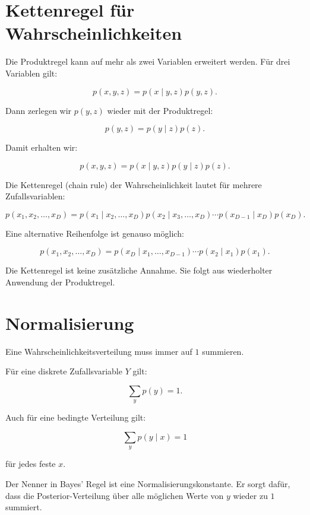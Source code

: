 \section{Kettenregel für Wahrscheinlichkeiten}

Die Produktregel kann auf mehr als zwei Variablen erweitert werden.
Für drei Variablen gilt:

\[
    p(x,y,z)
    =
    p(x \mid y,z)p(y,z).
\]

Dann zerlegen wir \(p(y,z)\) wieder mit der Produktregel:

\[
    p(y,z)
    =
    p(y \mid z)p(z).
\]

Damit erhalten wir:

\[
    p(x,y,z)
    =
    p(x \mid y,z)p(y \mid z)p(z).
\]

\begin{definitionbox}
Die Kettenregel (chain rule) der Wahrscheinlichkeit lautet für mehrere Zufallsvariablen:

\[
    p(x_1,x_2,\dots,x_D)
    =
    p(x_1 \mid x_2,\dots,x_D)
    p(x_2 \mid x_3,\dots,x_D)
    \cdots
    p(x_{D-1} \mid x_D)
    p(x_D).
\]
\end{definitionbox}

Eine alternative Reihenfolge ist genauso möglich:

\[
    p(x_1,x_2,\dots,x_D)
    =
    p(x_D \mid x_1,\dots,x_{D-1})
    \cdots
    p(x_2 \mid x_1)
    p(x_1).
\]

\begin{notebox}
Die Kettenregel ist keine zusätzliche Annahme.
Sie folgt aus wiederholter Anwendung der Produktregel.
\end{notebox}

\section{Normalisierung}

Eine Wahrscheinlichkeitsverteilung muss immer auf \(1\) summieren.

Für eine diskrete Zufallsvariable \(Y\) gilt:

\[
    \sum_y p(y) = 1.
\]

Auch für eine bedingte Verteilung gilt:

\[
    \sum_y p(y \mid x) = 1
\]

für jedes feste \(x\).

\begin{conceptbox}
Der Nenner in Bayes' Regel ist eine Normalisierungskonstante.
Er sorgt dafür, dass die Posterior-Verteilung über alle möglichen Werte von \(y\) wieder zu \(1\) summiert.
\end{conceptbox}

